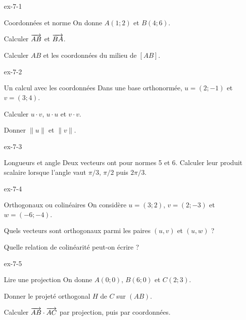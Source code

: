 \begin{blocLivre}{ex-7-1}
\begin{exercice}[1]{Coordonnées et norme}
On donne $A(1;2)$ et $B(4;6)$.\begin{questions}
\item Calculer $\overrightarrow{AB}$ et $\overrightarrow{BA}$.
\item Calculer $AB$ et les coordonnées du milieu de $[AB]$.
\end{questions}

\label{figgeo-07-01-ex}
\end{exercice}
\end{blocLivre}
\begin{blocLivre}{ex-7-2}
\begin{exercice}[1]{Un calcul avec les coordonnées}
Dans une base orthonormée, $u=(2;-1)$ et $v=(3;4)$.\begin{questions}
\item Calculer $u\cdot v$, $u\cdot u$ et $v\cdot v$.
\item Donner $\|u\|$ et $\|v\|$.
\end{questions}

\label{figgeo-07-02-ex}
\end{exercice}
\end{blocLivre}
\begin{blocLivre}{ex-7-3}
\begin{exercice}[1]{Longueurs et angle}
Deux vecteurs ont pour normes 5 et 6. Calculer leur produit scalaire lorsque l’angle vaut $\pi/3$, $\pi/2$ puis $2\pi/3$.
\label{figgeo-07-03-ex}
\end{exercice}
\end{blocLivre}
\begin{blocLivre}{ex-7-4}
\begin{exercice}[1]{Orthogonaux ou colinéaires}
On considère $u=(3;2)$, $v=(2;-3)$ et $w=(-6;-4)$.\begin{questions}
\item Quels vecteurs sont orthogonaux parmi les paires $(u,v)$ et $(u,w)$ ?
\item Quelle relation de colinéarité peut-on écrire ?
\end{questions}

\label{figgeo-07-04-ex}
\end{exercice}
\end{blocLivre}
\begin{blocLivre}{ex-7-5}
\begin{exercice}[1]{Lire une projection}
On donne $A(0;0)$, $B(6;0)$ et $C(2;3)$.\begin{questions}
\item Donner le projeté orthogonal $H$ de $C$ sur $(AB)$.
\item Calculer $\overrightarrow{AB}\cdot\overrightarrow{AC}$ par projection, puis par coordonnées.
\end{questions}

\label{figgeo-07-05-ex}
\end{exercice}
\end{blocLivre}
